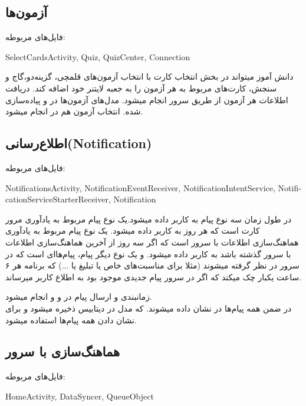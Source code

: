 \documentclass[11pt]{article}
\begin{document}
\subsection{آزمون‌ها}

فایل‌های مربوطه:\\
\begin{latin}
SelectCardsActivity, Quiz, QuizCenter, Connection\\
\end{latin}

دانش آموز میتواند در بخش انتخاب کارت با انتخاب آزمون‌های قلمچی، گزینه‌دو،گاج و سنجش، کارت‌های مربوط به هر آزمون را به جعبه لایتنر خود اضافه کند. دریافت اطلاعات هر آزمون از طریق سرور انجام میشود. مدل‌‌های آزمون‌ها در  و  پیاده‌سازی شده. انتخاب آزمون هم در  انجام میشود. 


\subsection{اطلاع‌رسانی(Notification)}
فایل‌های مربوطه:\\
\begin{latin}
NotificationsActivity, NotificationEventReceiver, NotificationIntentService, NotificationServiceStarterReceiver, Notification\\
\end{latin}

در طول زمان سه نوع پیام به کاربر داده میشود.یک نوع پیام مربوط به یاد‌آوری مرور کارت‌ است که هر روز به کاربر داده میشود. یک نوع پیام مربوط به یاد‌آوری هماهنگ‌سازی اطلاعات با سرور است که اگر سه روز از آخرین هماهنگ‌سازی اطلاعات با سرور گذشته باشد به کاربر داده میشود. و یک نوع دیگر پیام، پیام‌ها‌ای است که در سرور در نظر گرفته میشوند (مثلا برای مناسبت‌های خاص یا تبلیغ یا ...) که برنامه هر ۶ ساعت یکبار چک میکند که اگر در سرور پیام جدیدی موجود بود به اطلاع کاربر میرساند.\par
زمانبندی و ارسال پیام در  و  و  انجام میشود.\\
در ضمن همه پیام‌ها در  نشان داده میشوند. که مدل  در دیتابیس ذخیره میشود و برای نشان دادن همه پیام‌ها استفاده میشود.

\subsection{هماهنگ‌سازی با سرور}

فایل‌های مربوطه:\\
\begin{latin}
HomeActivity, DataSyncer, QueueObject\\
\end{latin}
\end{document}
